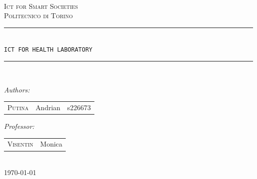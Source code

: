 \documentclass[12pt]{article}
\begin{document}
\begin{titlepage}

\newcommand{\HRule}{\rule{\linewidth}{0.5 mm}}
\center
\textsc{}\\[1cm]
\textsc{\Large Ict for Smart Societies}\\[0.4cm]
\textsc{\large Politecnico di Torino}\\[0.4cm]
\HRule\\[0.5cm]
{\huge \texttt{ICT FOR HEALTH LABORATORY}}\\[0.05cm]
\HRule\\[3cm]

\begin{minipage}{\textwidth}
\large
\emph{Authors:}\\[0.4cm]
\begin{tabular}{lll}
\textsc{Putina} &Andrian & s226673\\
\end{tabular}
\end{minipage}

\vspace{0.7cm}

\begin{minipage}{\textwidth}
\large
\emph{Professor:}\\[0.2cm]
\begin{tabular}{ll}
\textsc{Visentin} &Monica
\end{tabular}
\end{minipage}

\vspace{1cm}

\\[1cm]

{\large \today}\\[3cm]

\vfill

\end{titlepage}
\end{document}
